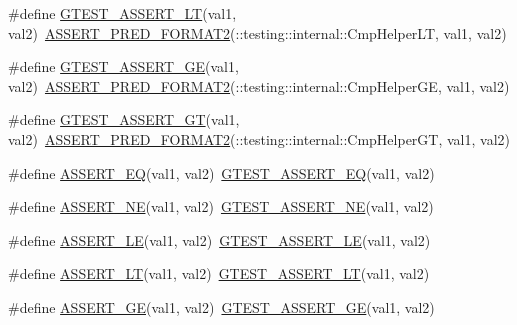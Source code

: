 \begin{DoxyCompactItemize}
\item 
\#define \hyperlink{fused-src_2gtest_2gtest_8h_a5a75667e637febd18e5f7d4f3abf55e8}{\-G\-T\-E\-S\-T\-\_\-\-A\-S\-S\-E\-R\-T\-\_\-\-L\-T}(val1, val2)~\hyperlink{gtest__pred__impl_8h_ac452685a1a98ea3d96eb956a062ee210}{\-A\-S\-S\-E\-R\-T\-\_\-\-P\-R\-E\-D\-\_\-\-F\-O\-R\-M\-A\-T2}(\-::testing\-::internal\-::\-Cmp\-Helper\-L\-T, val1, val2)
\item 
\#define \hyperlink{fused-src_2gtest_2gtest_8h_a55373d99c079ff1b894e2eb5bcd15c5a}{\-G\-T\-E\-S\-T\-\_\-\-A\-S\-S\-E\-R\-T\-\_\-\-G\-E}(val1, val2)~\hyperlink{gtest__pred__impl_8h_ac452685a1a98ea3d96eb956a062ee210}{\-A\-S\-S\-E\-R\-T\-\_\-\-P\-R\-E\-D\-\_\-\-F\-O\-R\-M\-A\-T2}(\-::testing\-::internal\-::\-Cmp\-Helper\-G\-E, val1, val2)
\item 
\#define \hyperlink{fused-src_2gtest_2gtest_8h_a088b9056fd1c1f316b41c22f64deb33a}{\-G\-T\-E\-S\-T\-\_\-\-A\-S\-S\-E\-R\-T\-\_\-\-G\-T}(val1, val2)~\hyperlink{gtest__pred__impl_8h_ac452685a1a98ea3d96eb956a062ee210}{\-A\-S\-S\-E\-R\-T\-\_\-\-P\-R\-E\-D\-\_\-\-F\-O\-R\-M\-A\-T2}(\-::testing\-::internal\-::\-Cmp\-Helper\-G\-T, val1, val2)
\item 
\#define \hyperlink{fused-src_2gtest_2gtest_8h_a1a6db8b1338ee7040329322b77779086}{\-A\-S\-S\-E\-R\-T\-\_\-\-E\-Q}(val1, val2)~\hyperlink{include_2gtest_2gtest_8h_ab49d537c37c637256307f8d55154050c}{\-G\-T\-E\-S\-T\-\_\-\-A\-S\-S\-E\-R\-T\-\_\-\-E\-Q}(val1, val2)
\item 
\#define \hyperlink{fused-src_2gtest_2gtest_8h_aa866c8dece57912e6f51495ed3e8d8d5}{\-A\-S\-S\-E\-R\-T\-\_\-\-N\-E}(val1, val2)~\hyperlink{include_2gtest_2gtest_8h_a6fa9bb2b6731eba8f481e40e9e4931b3}{\-G\-T\-E\-S\-T\-\_\-\-A\-S\-S\-E\-R\-T\-\_\-\-N\-E}(val1, val2)
\item 
\#define \hyperlink{fused-src_2gtest_2gtest_8h_a775643748feff0b490aae651d041e971}{\-A\-S\-S\-E\-R\-T\-\_\-\-L\-E}(val1, val2)~\hyperlink{include_2gtest_2gtest_8h_abef04dcd4a0259d378de7b3b3ffb6730}{\-G\-T\-E\-S\-T\-\_\-\-A\-S\-S\-E\-R\-T\-\_\-\-L\-E}(val1, val2)
\item 
\#define \hyperlink{fused-src_2gtest_2gtest_8h_affc4f9cae4c3aabfe60fced83737b42c}{\-A\-S\-S\-E\-R\-T\-\_\-\-L\-T}(val1, val2)~\hyperlink{include_2gtest_2gtest_8h_a5a75667e637febd18e5f7d4f3abf55e8}{\-G\-T\-E\-S\-T\-\_\-\-A\-S\-S\-E\-R\-T\-\_\-\-L\-T}(val1, val2)
\item 
\#define \hyperlink{fused-src_2gtest_2gtest_8h_af4ff5dc71479fcb374b6bc2ed195bcc4}{\-A\-S\-S\-E\-R\-T\-\_\-\-G\-E}(val1, val2)~\hyperlink{include_2gtest_2gtest_8h_a55373d99c079ff1b894e2eb5bcd15c5a}{\-G\-T\-E\-S\-T\-\_\-\-A\-S\-S\-E\-R\-T\-\_\-\-G\-E}(val1, val2)

\end{DoxyCompactItemize}
